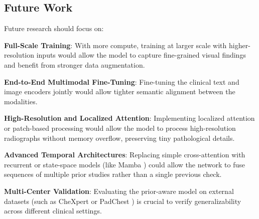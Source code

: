 \subsection{Future Work}
\label{subsec:discussion_future}

Future research should focus on:

\textbf{Full-Scale Training}: With more compute, training at larger scale with higher-resolution inputs would allow the model to capture fine-grained visual findings and benefit from stronger data augmentation.

\textbf{End-to-End Multimodal Fine-Tuning}: Fine-tuning the clinical text and image encoders jointly would allow tighter semantic alignment between the modalities.

\textbf{High-Resolution and Localized Attention}: Implementing localized attention or patch-based processing would allow the model to process high-resolution radiographs without memory overflow, preserving tiny pathological details.

\textbf{Advanced Temporal Architectures}: Replacing simple cross-attention with recurrent or state-space models (like Mamba \cite{gu2024mamba}) could allow the network to fuse sequences of multiple prior studies rather than a single previous check.

\textbf{Multi-Center Validation}: Evaluating the prior-aware model on external datasets (such as CheXpert or PadChest \cite{bustos2020padchest}) is crucial to verify generalizability across different clinical settings.
